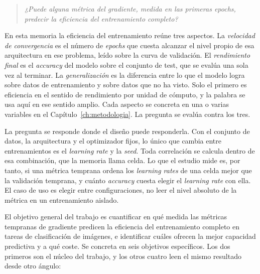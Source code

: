 \begin{quote}
\itshape ¿Puede alguna métrica del gradiente, medida en las primeras \emph{epochs}, predecir la eficiencia del entrenamiento completo?
\end{quote}

En esta memoria la eficiencia del entrenamiento reúne tres aspectos. La \emph{velocidad de convergencia} es el número de \emph{epochs} que cuesta alcanzar el nivel propio de esa arquitectura en ese problema, leído sobre la curva de validación. El \emph{rendimiento final} es el \emph{accuracy} del modelo sobre el conjunto de test, que se evalúa una sola vez al terminar. La \emph{generalización} es la diferencia entre lo que el modelo logra sobre datos de entrenamiento y sobre datos que no ha visto. Solo el primero es eficiencia en el sentido de rendimiento por unidad de cómputo, y la palabra se usa aquí en ese sentido amplio. Cada aspecto se concreta en una o varias variables en el Capítulo~\ref{ch:metodologia}. La pregunta se evalúa contra los tres.

La pregunta se responde donde el diseño puede responderla. Con el conjunto de datos, la arquitectura y el optimizador fijos, lo único que cambia entre entrenamientos es el \emph{learning rate} y la \emph{seed}. Toda correlación se calcula dentro de esa combinación, que la memoria llama celda. Lo que el estudio mide es, por tanto, si una métrica temprana ordena los \emph{learning rates} de una celda mejor que la validación temprana, y cuánto \emph{accuracy} cuesta elegir el \emph{learning rate} con ella. El caso de uso es elegir entre configuraciones, no leer el nivel absoluto de la métrica en un entrenamiento aislado.

El objetivo general del trabajo es cuantificar en qué medida las métricas tempranas de gradiente predicen la eficiencia del entrenamiento completo en tareas de clasificación de imágenes, e identificar cuáles ofrecen la mejor capacidad predictiva y a qué coste. Se concreta en seis objetivos específicos. Los dos primeros son el núcleo del trabajo, y los otros cuatro leen el mismo resultado desde otro ángulo:

